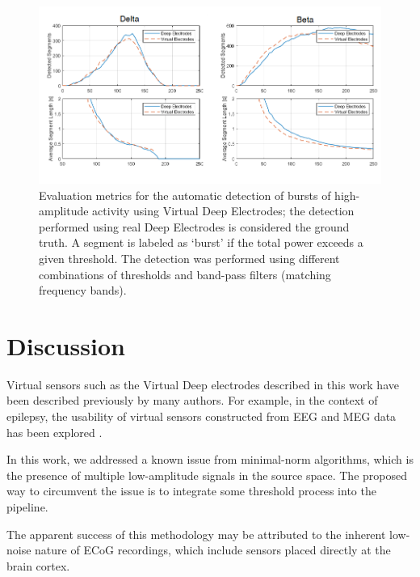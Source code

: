 \documentclass[draftcls, onecolumn, peerreview]{IEEEtran}
\begin{document}
\begin{figure}[!t]
\centering
\includegraphics[width=16cm]{./img/improvised}
\caption{Evaluation metrics for the automatic detection of bursts of high-amplitude activity using Virtual Deep Electrodes; the detection performed using real Deep Electrodes is considered the ground truth. 
A segment is labeled as `burst' if the total power exceeds a given threshold.
The detection was performed using different combinations of thresholds and band-pass filters (matching frequency bands).}
\label{fig:segment_stats}
\end{figure}


\section{Discussion}
\label{sec:discussion}

Virtual sensors such as the Virtual Deep electrodes described in this work have been described previously by many authors.
%
For example, in the context of epilepsy, the usability of virtual sensors constructed from EEG and MEG data has been explored \cite{sohrabpour2020noninvasive,tamilia2021noninvasive}.

In this work, we addressed a known issue from minimal-norm algorithms, which is the presence of multiple low-amplitude signals in the source space.
%
The proposed way to circumvent the issue is to integrate some threshold process into the pipeline.


The apparent success of this methodology may be attributed to the inherent low-noise nature of ECoG recordings, which include sensors placed directly at the brain cortex.
\end{document}
